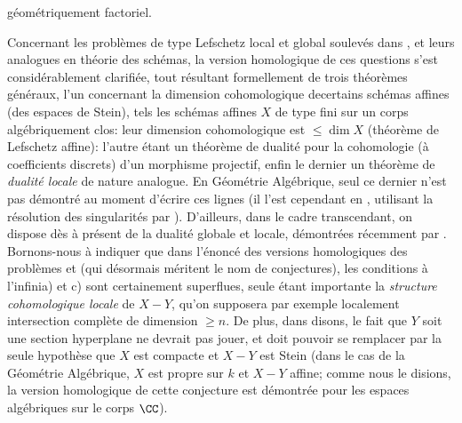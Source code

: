 g\'eom\'etriquement factoriel.

Concernant les probl\`emes de type Lefschetz local et global soulev\'es dans , et leurs analogues en th\'eorie des sch\'emas, la version homologique de ces questions s'est consid\'erablement clarifi\'ee, tout r\'esultant formellement de trois th\'eor\`emes g\'en\'eraux, l'un concernant la dimension cohomologique de\pageoriginale certains sch\'emas affines (\resp des espaces de Stein), tels les sch\'emas affines $X$ de type fini sur un corps alg\'ebriquement clos: leur dimension cohomologique est $\leq\dim X$ (\og th\'eor\`eme de Lefschetz affine{\fg}): l'autre \'etant un th\'eor\`eme de dualit\'e pour la cohomologie (\`a coefficients discrets) d'un morphisme projectif, enfin le dernier un th\'eor\`eme de \emph{dualit\'e locale} de nature analogue. En G\'eom\'etrie Alg\'ebrique, seul ce dernier n'est pas d\'emontr\'e au moment d'\'ecrire ces lignes (il l'est cependant en , utilisant la r\'esolution des singularit\'es par ). D'ailleurs, dans le cadre transcendant, on dispose d\`es \`a pr\'esent de la dualit\'e globale et locale, d\'emontr\'ees r\'ecemment par . Bornons-nous \`a indiquer que dans l'\'enonc\'e des versions homologiques des probl\`emes  et  (qui d\'esormais m\'eritent le nom de conjectures), les conditions \og \`a l'infini\fg a) et c) sont certainement superflues, seule \'etant importante la \emph{structure cohomologique locale} de $X-Y$, qu'on supposera par exemple localement intersection compl\`ete de dimension $\geq n$. De plus, dans  disons, le fait que $Y$ soit une section hyperplane ne devrait pas jouer, et doit pouvoir se remplacer par la seule hypoth\`ese que $X$ est compacte et $X-Y$ est Stein (\ie dans le cas de la G\'eom\'etrie Alg\'ebrique, $X$ est propre sur $k$ et $X-Y$ affine; comme nous le disions, la version homologique de cette conjecture est d\'emontr\'ee pour les espaces alg\'ebriques sur le corps $\CC$).


